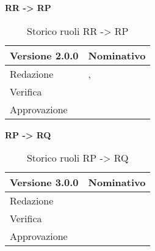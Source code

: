 \textbf{RR -> RP}
\label{tabVers2}
\begin{table}[h]
	\begin{tabular}{p{} p{}}
		\toprule \textbf{Versione 2.0.0}	&	\textbf{Nominativo}\\
		\midrule Redazione	& \VG, \BM\\
		\midrule Verifica &	\PM\\
		\midrule Approvazione	& \BM\\
		\bottomrule
	\end{tabular}
	\caption{Storico ruoli RR -> RP}
\end{table}

\textbf{RP -> RQ}
\label{tabVers3}
\begin{table}[h]
	\begin{tabular}{p{} p{}}
		\toprule \textbf{Versione 3.0.0}	&	\textbf{Nominativo}\\
		\midrule Redazione	& \VG\\
		\midrule Verifica &	\PM\\
		\midrule Approvazione	& \FM\\
		\bottomrule
	\end{tabular}
	\caption{Storico ruoli RP -> RQ}
\end{table}